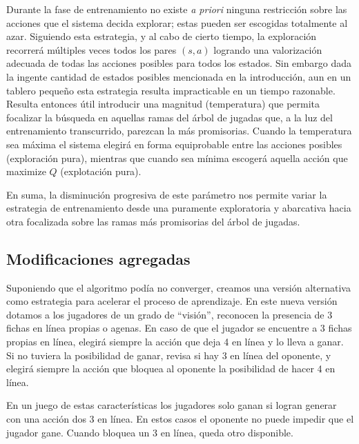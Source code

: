 \documentclass[11pt, spanish]{article}
\begin{document}
\par Durante la fase de entrenamiento no existe \emph{a priori} ninguna 
restricción sobre las acciones que el sistema decida explorar; estas pueden ser 
escogidas totalmente al azar. Siguiendo esta estrategia, y al cabo de 
cierto tiempo, la exploración recorrerá múltiples veces todos los pares 
$(s,a)$ logrando una valorización adecuada de todas las acciones posibles para 
todos los estados. Sin embargo dada la ingente cantidad de estados posibles 
mencionada en la introducción, aun en un tablero pequeño esta estrategia 
resulta impracticable en un tiempo razonable. Resulta entonces útil introducir 
una magnitud (temperatura) que permita focalizar la búsqueda en aquellas ramas 
del árbol de jugadas que, a la luz del entrenamiento transcurrido, parezcan la 
más promisorias. Cuando la temperatura sea máxima el sistema elegirá en forma 
equiprobable entre las acciones posibles (exploración pura), mientras que 
cuando sea mínima escogerá aquella acción que maximize $Q$ (explotación pura).
\par En suma, la disminución progresiva de este parámetro nos permite variar la 
estrategia de entrenamiento desde una puramente exploratoria y abarcativa hacia 
otra focalizada sobre las ramas más promisorias del árbol de jugadas.

\subsection{Modificaciones agregadas}

\par Suponiendo que el algoritmo pod\'ia no converger, creamos una versión alternativa como estrategia para acelerar el proceso de aprendizaje. En este nueva versi\'on dotamos a los jugadores de un grado de ``visi\'on'', reconocen la presencia de 3 fichas en línea propias o agenas. En caso de que el jugador se encuentre a 3 fichas propias en l\'inea, elegir\'a siempre la acci\'on que deja 4 en l\'inea y lo lleva a ganar. Si no tuviera la posibilidad de ganar, revisa si hay 3 en l\'inea del oponente, y elegir\'a siempre la acci\'on que bloquea al oponente la posibilidad de hacer 4 en l\'inea.    

\par En un juego de estas caracter\'isticas los jugadores solo ganan si logran generar con una acci\'on dos 3 en l\'inea. En estos casos el oponente no puede impedir que el jugador gane. Cuando bloquea un 3 en l\'inea, queda otro disponible. 
\end{document}
